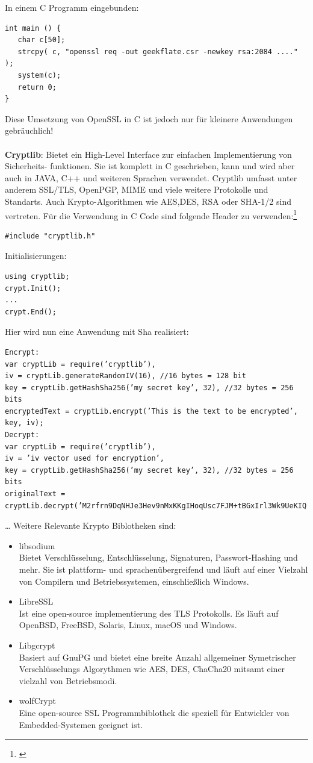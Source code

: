 \documentclass[a4paper,12pt]{scrartcl}
\begin{document}
In einem C Programm eingebunden:
\begin{verbatim}
int main () {
   char c[50]; 
   strcpy( c, "openssl req -out geekflate.csr -newkey rsa:2084 ...." );
   system(c);
   return 0;
} 
\end{verbatim}
Diese Umsetzung von OpenSSL in C ist jedoch nur für kleinere Anwendungen\\ gebräuchlich!\\
\\
\textbf{Cryptlib}:
Bietet ein High-Level Interface zur einfachen Implementierung von Sicherheits-
funktionen. Sie ist komplett in C geschrieben, kann und wird aber auch in JAVA, C++ und weiteren Sprachen verwendet. Cryptlib umfasst unter anderem SSL/TLS, OpenPGP, MIME und viele weitere Protokolle und Standarts. Auch Krypto-Algorithmen wie AES,DES, RSA oder SHA-1/2 sind vertreten. Für die Verwendung in C Code sind 
folgende Header zu verwenden:\footnote{\cite{1028896}}
\begin{verbatim}
#include "cryptlib.h"
\end{verbatim}
Initialisierungen:
\begin{verbatim}
using cryptlib;
crypt.Init();
...
crypt.End();
\end{verbatim}
Hier wird nun eine Anwendung mit Sha realisiert:
\begin{verbatim}
Encrypt:
var cryptLib = require(’cryptlib’),
iv = cryptLib.generateRandomIV(16), //16 bytes = 128 bit
key = cryptLib.getHashSha256(’my secret key’, 32), //32 bytes = 256 bits
encryptedText = cryptLib.encrypt(’This is the text to be encrypted’, key, iv);
Decrypt:
var cryptLib = require(’cryptlib’),
iv = ’iv vector used for encryption’,
key = cryptLib.getHashSha256(’my secret key’, 32), //32 bytes = 256 bits
originalText = cryptLib.decrypt(’M2rfrn9DqNHJe3Hev9nMxKKgIHoqUsc7FJM+tBGxIrl3Wk9UeKIQ
\end{verbatim}
\dots
\newpage
Weitere Relevante Krypto Biblotheken sind:
\begin{itemize}
\item libsodium \\Bietet Verschlüsselung, Entschlüsselung, Signaturen, Passwort-Hashing und mehr. Sie ist plattform- und sprachenübergreifend und läuft auf einer Vielzahl von Compilern und Betriebssystemen, einschließlich Windows.

\item LibreSSL\\
Ist eine open-source implementierung des TLS Protokolls. Es läuft auf  	OpenBSD, FreeBSD, Solaris, Linux, macOS und Windows.
\item Libgcrypt\\
Basiert auf GnuPG und bietet eine breite Anzahl allgemeiner Symetrischer Verschlüsselungs Algorythmen wie AES, DES, ChaCha20 mitsamt einer vielzahl von Betriebsmodi. 
\item wolfCrypt\\
Eine open-source SSL Programmbiblothek die speziell für Entwickler von Embedded-Systemen geeignet ist.

\end{itemize}
\end{document}
